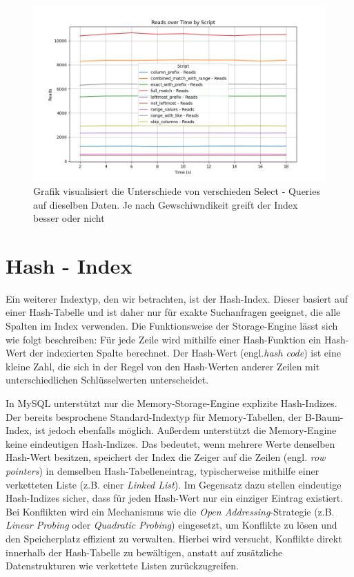 \begin{figure}[!ht]
    \centering
    \includegraphics[width=.8\textwidth]{PNGs/Index/B-Tree/Query_Reads}
    \caption[B - Tree - Selects - Ergebnis]{Grafik visualisiert die Unterschiede von verschieden Select - Queries auf dieselben Daten. Je nach Gewschiwndikeit greift der Index besser oder nicht }
    \label{fig:b-tree-query-reads}
\end{figure}


\section{Hash - Index}
Ein weiterer Indextyp, den wir betrachten, ist der Hash-Index.
Dieser basiert auf einer Hash-Tabelle und ist daher nur für exakte Suchanfragen geeignet, die alle Spalten im Index verwenden.
Die Funktionsweise der Storage-Engine lässt sich wie folgt beschreiben: Für jede Zeile wird mithilfe einer Hash-Funktion ein Hash-Wert der indexierten Spalte berechnet.
Der Hash-Wert (engl.\textit{hash code}) ist eine kleine Zahl, die sich in der Regel von den Hash-Werten anderer Zeilen mit unterschiedlichen Schlüsselwerten unterscheidet.


In MySQL unterstützt nur die Memory-Storage-Engine explizite Hash-Indizes.
Der bereits besprochene Standard-Indextyp für Memory-Tabellen, der B-Baum-Index, ist jedoch ebenfalls möglich.
Außerdem unterstützt die Memory-Engine keine eindeutigen Hash-Indizes.
Das bedeutet, wenn mehrere Werte denselben Hash-Wert besitzen, speichert der Index die Zeiger auf die Zeilen (engl. \textit{row pointers}) in demselben Hash-Tabelleneintrag, typischerweise mithilfe einer verketteten Liste (z.B. einer \textit{Linked List}).
Im Gegensatz dazu stellen eindeutige Hash-Indizes sicher, dass für jeden Hash-Wert nur ein einziger Eintrag existiert.
Bei Konflikten wird ein Mechanismus wie die \textit{Open Addressing}-Strategie (z.B. \textit{Linear Probing} oder \textit{Quadratic Probing}) eingesetzt, um Konflikte zu lösen und den Speicherplatz effizient zu verwalten.
Hierbei wird versucht, Konflikte direkt innerhalb der Hash-Tabelle zu bewältigen, anstatt auf zusätzliche Datenstrukturen wie verkettete Listen zurückzugreifen.


